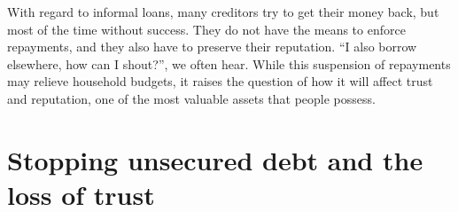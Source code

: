 \documentclass[a4paper, 11pt, onecolumn]{article}
\begin{document}
With regard to informal loans, many creditors try to get their money back, but most of the time without success.
They do not have the means to enforce repayments, and they also have to preserve their reputation. 
``I also borrow elsewhere, how can I shout?'', we often hear. 
While this suspension of repayments may relieve household budgets, it raises the question of how it will affect trust and reputation, one of the most valuable assets that people possess.









\section{Stopping unsecured debt and the loss of trust}
\label{section:trust}
\end{document}

